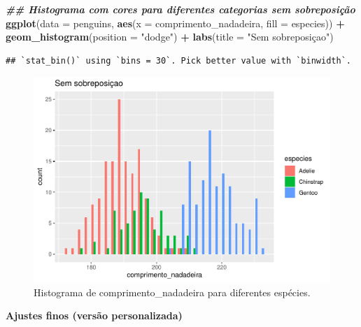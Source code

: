 \documentclass[
]{article}
\newenvironment{Shaded}{\begin{snugshade}}{\end{snugshade}}
\newcommand{\AttributeTok}[1]{\textcolor[rgb]{0.13,0.29,0.53}{#1}}
\newcommand{\DocumentationTok}[1]{\textcolor[rgb]{0.56,0.35,0.01}{\textbf{\textit{#1}}}}
\newcommand{\FunctionTok}[1]{\textcolor[rgb]{0.13,0.29,0.53}{\textbf{#1}}}
\newcommand{\NormalTok}[1]{#1}
\newcommand{\SpecialCharTok}[1]{\textcolor[rgb]{0.81,0.36,0.00}{\textbf{#1}}}
\newcommand{\StringTok}[1]{\textcolor[rgb]{0.31,0.60,0.02}{#1}}
\begin{document}
\begin{Shaded}
\begin{Highlighting}[]
\DocumentationTok{\#\# Histograma com cores para diferentes categorias sem sobreposição}
\FunctionTok{ggplot}\NormalTok{(}\AttributeTok{data =}\NormalTok{ penguins, }
       \FunctionTok{aes}\NormalTok{(}\AttributeTok{x =}\NormalTok{ comprimento\_nadadeira, }\AttributeTok{fill =}\NormalTok{ especies)) }\SpecialCharTok{+} 
      \FunctionTok{geom\_histogram}\NormalTok{(}\AttributeTok{position =} \StringTok{"dodge"}\NormalTok{) }\SpecialCharTok{+} 
       \FunctionTok{labs}\NormalTok{(}\AttributeTok{title =} \StringTok{"Sem sobreposiçao"}\NormalTok{)}
\end{Highlighting}
\end{Shaded}

\begin{verbatim}
## `stat_bin()` using `bins = 30`. Pick better value with `binwidth`.
\end{verbatim}

\begin{figure}
\centering
\includegraphics{epr_files/figure-latex/fig-hist-cat-2.pdf}
\caption{\label{fig:fig-hist-cat-2}Histograma de comprimento\_nadadeira para diferentes espécies.}
\end{figure}

\textbf{Ajustes finos (versão personalizada)}
\end{document}

